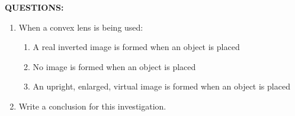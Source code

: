 {{\newpage
\textbf{QUESTIONS:}
\begin{enumerate}
\item When a convex lens is being used:

\begin{enumerate}
\item A real inverted image is formed when an object is placed \underline{\hspace{3cm}}
\item No image is formed when an object is placed \underline{\hspace{3cm}}
\item An upright, enlarged, virtual image is formed when an object is placed \underline{\hspace{3cm}}
\end{enumerate}

\item Write a conclusion for this investigation.
\end{enumerate}
}
}

